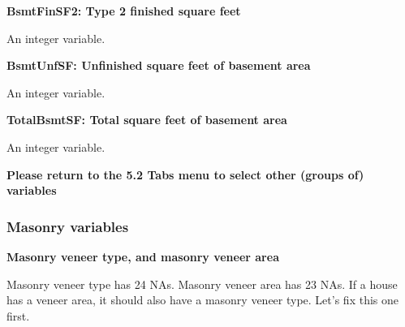 \documentclass[]{article}
\newenvironment{Shaded}{\begin{snugshade}}{\end{snugshade}}
\newcommand{\KeywordTok}[1]{\textcolor[rgb]{0.13,0.29,0.53}{\textbf{#1}}}
\newcommand{\DecValTok}[1]{\textcolor[rgb]{0.00,0.00,0.81}{#1}}
\newcommand{\StringTok}[1]{\textcolor[rgb]{0.31,0.60,0.02}{#1}}
\newcommand{\CommentTok}[1]{\textcolor[rgb]{0.56,0.35,0.01}{\textit{#1}}}
\newcommand{\OperatorTok}[1]{\textcolor[rgb]{0.81,0.36,0.00}{\textbf{#1}}}
\newcommand{\NormalTok}[1]{#1}
\begin{document}
\textbf{BsmtFinSF2: Type 2 finished square feet}

An integer variable.

\begin{Shaded}
\end{Shaded}

\textbf{BsmtUnfSF: Unfinished square feet of basement area}

An integer variable.

\begin{Shaded}
\end{Shaded}

\textbf{TotalBsmtSF: Total square feet of basement area}

An integer variable.

\begin{Shaded}
\end{Shaded}

\textbf{Please return to the 5.2 Tabs menu to select other (groups of)
variables}

\subsubsection{Masonry variables}\label{masonry-variables}

\textbf{Masonry veneer type, and masonry veneer area}

Masonry veneer type has 24 NAs. Masonry veneer area has 23 NAs. If a
house has a veneer area, it should also have a masonry veneer type.
Let's fix this one first.

\begin{Shaded}
\end{Shaded}
\end{document}
